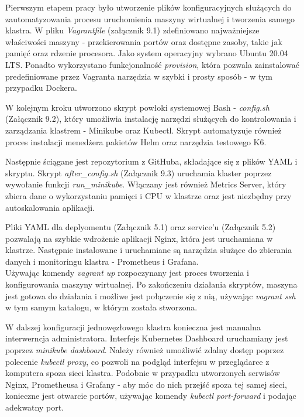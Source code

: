 Pierwszym etapem pracy było utworzenie plików konfiguracyjnych służących do zautomatyzowania procesu uruchomienia maszyny wirtualnej i tworzenia samego klastra. W pliku \textit{Vagrantfile} (załącznik 9.1) zdefiniowano najważniejsze właściwości maszyny - przekierowania portów oraz dostępne zasoby, takie jak pamięć oraz rdzenie procesora. Jako system operacyjny wybrano Ubuntu 20.04 LTS. Ponadto wykorzystano funkcjonalność \textit{provision}, która pozwala zainstalować predefiniowane przez Vagranta narzędzia w szybki i prosty sposób - w tym przypadku Dockera.

W kolejnym kroku utworzono skrypt powłoki systemowej Bash - \textit{config.sh} (Załącznik 9.2), który umożliwia instalację narzędzi służących do kontrolowania i zarządzania klastrem - Minikube oraz Kubectl. Skrypt automatyzuje również proces instalacji menedżera pakietów Helm oraz narzędzia testowego K6. 

Następnie ściągane jest repozytorium z GitHuba, składające się z plików YAML i skryptu.
Skrypt \textit{after\_config.sh} (Załącznik 9.3) uruchamia klaster poprzez wywołanie funkcji \textit{run\_minikube}. Włączany jest również Metrics Server, który zbiera dane o wykorzystaniu pamięci i CPU w klastrze oraz jest niezbędny przy autoskalowania aplikacji.

Pliki YAML dla deplyomentu (Załącznik 5.1) oraz service'u (Załącznik 5.2) pozwalają na szybkie wdrożenie aplikacji Nginx, która jest uruchamiana w klastrze. Następnie instalowane i uruchamiane są narzędzia służące do zbierania danych i monitoringu klastra - Prometheus i Grafana.\\

Używając komendy \textit{vagrant up} rozpoczynany jest proces tworzenia i konfigurowania maszyny wirtualnej. Po zakończeniu działania skryptów, maszyna jest gotowa do działania i możliwe jest połączenie się z nią, używając \textit{vagrant ssh} w tym samym katalogu, w którym została stworzona.

W dalszej konfiguracji jednowęzłowego klastra konieczna jest manualna interwerncja administratora. Interfejs Kubernetes Dashboard uruchamiany jest poprzez \textit{minikube dashboard}. Należy również umożliwić zdalny dostęp poprzez polecenie \textit{kubectl proxy}, co pozwoli na podgląd interfejsu w przeglądarce z komputera spoza sieci klastra. Podobnie w przypadku utworzonych serwisów Nginx, Prometheusa i Grafany - aby móc do nich przejść spoza tej samej sieci, konieczne jest otwarcie portów, używając komendy \textit{kubectl port-forward} i podając adekwatny port. 

